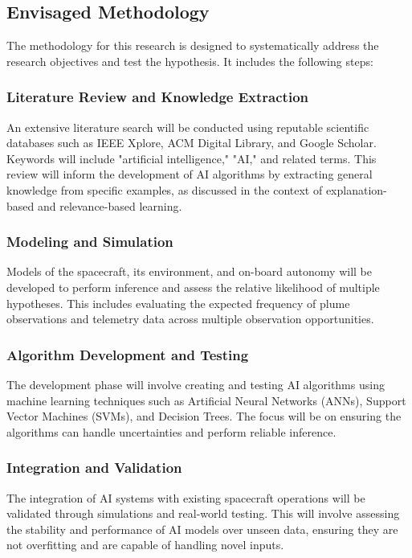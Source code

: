 \documentclass[a4paper, 11pt]{article}
\begin{document}
\subsection{Envisaged Methodology}

The methodology for this research is designed to systematically address the research objectives and test the hypothesis. It includes the following steps:

\subsubsection{Literature Review and Knowledge Extraction}

An extensive literature search will be conducted using reputable scientific databases such as IEEE Xplore, ACM Digital Library, and Google Scholar. Keywords will include "artificial intelligence," "AI," and related terms. This review will inform the development of AI algorithms by extracting general knowledge from specific examples, as discussed in the context of explanation-based and relevance-based learning.

\subsubsection{Modeling and Simulation}

Models of the spacecraft, its environment, and on-board autonomy will be developed to perform inference and assess the relative likelihood of multiple hypotheses. This includes evaluating the expected frequency of plume observations and telemetry data across multiple observation opportunities.

\subsubsection{Algorithm Development and Testing}

The development phase will involve creating and testing AI algorithms using machine learning techniques such as Artificial Neural Networks (ANNs), Support Vector Machines (SVMs), and Decision Trees. The focus will be on ensuring the algorithms can handle uncertainties and perform reliable inference.

\subsubsection{Integration and Validation}

The integration of AI systems with existing spacecraft operations will be validated through simulations and real-world testing. This will involve assessing the stability and performance of AI models over unseen data, ensuring they are not overfitting and are capable of handling novel inputs.
\end{document}
